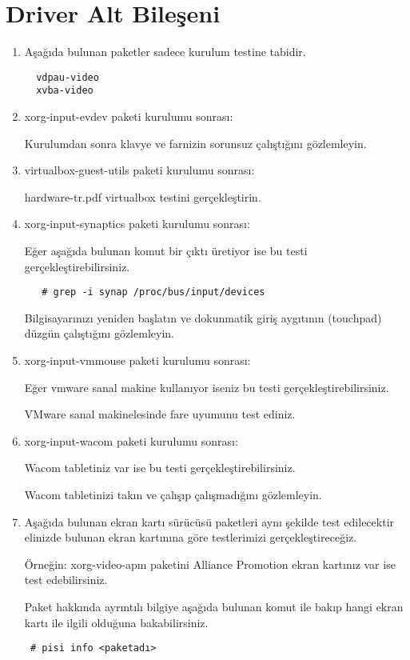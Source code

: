 \documentclass[a4paper,10pt]{article}
\begin{document}
\section{Driver Alt Bileşeni}
\begin{enumerate}
\item Aşağıda bulunan paketler sadece kurulum testine tabidir.
  \begin{verbatim}
  vdpau-video
  xvba-video   
  \end{verbatim}

  \item xorg-input-evdev paketi kurulumu sonrası:

Kurulumdan sonra klavye ve farnizin sorunsuz çalıştığını gözlemleyin.
  \item virtualbox-guest-utils paketi kurulumu sonrası:

hardware-tr.pdf virtualbox testini gerçekleştirin.

  \item xorg-input-synaptics  paketi kurulumu sonrası:

Eğer aşağıda bulunan komut bir çıktı üretiyor ise bu testi gerçekleştirebilirsiniz.
  \begin{verbatim}
   # grep -i synap /proc/bus/input/devices
  \end{verbatim}

Bilgisayarınızı yeniden başlatın ve dokunmatik giriş aygıtının (touchpad) düzgün çalıştığını gözlemleyin.

\item xorg-input-vmmouse paketi kurulumu sonrası:

Eğer vmware sanal makine kullanıyor iseniz bu testi gerçekleştirebilirsiniz. 

VMware sanal makinelesinde fare uyumunu test ediniz.

\item xorg-input-wacom paketi kurulumu sonrası:

Wacom tabletiniz var ise bu testi gerçekleştirebilirsiniz.

Wacom tabletinizi takın ve çalışıp çalışmadığını gözlemleyin.

\item Aşağıda bulunan ekran kartı sürücüsü paketleri aynı şekilde test edilecektir elinizde bulunan ekran kartınına göre testlerimizi gerçekleştireceğiz. 

Örneğin: xorg-video-apm paketini Alliance Promotion ekran kartınız var ise test edebilirsiniz.

Paket hakkında ayrıntılı bilgiye aşağıda bulunan komut ile bakıp hangi ekran kartı ile ilgili olduğuna bakabilirsiniz.
\begin{verbatim}
 # pisi info <paketadı>
\end{verbatim}


\end{enumerate}
\end{document}
